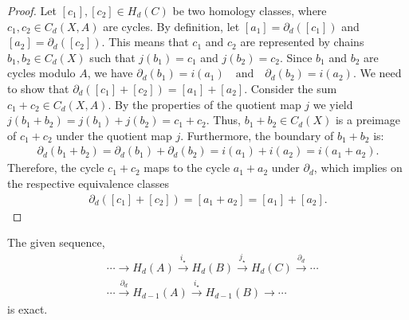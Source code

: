 \begin{proof}
	Let \([c_{1}], [c_{2}] \in H_{d}(C)\) be two homology classes, where \(c_{1}, c_{2} \in C_{d}(X, A)\) are cycles. By definition, let \([a_{1}] = \partial_{d}([c_{1}])\) and \([a_{2}] = \partial_{d}([c_{2}])\). This means that \(c_{1}\) and \(c_{2}\) are represented by chains \(b_{1}, b_{2} \in C_{d}(X)\) such that \(j(b_{1}) = c_{1}\) and \(j(b_{2}) = c_{2}\). Since \(b_{1}\) and \(b_{2}\) are cycles modulo \(A\), we have $\partial_{d}(b_{1}) = i(a_{1}) \quad \text{and} \quad \partial_{d}(b_{2}) = i(a_{2})$. We need to show that $\partial_{d}([c_{1}] + [c_{2}]) = [a_{1}] + [a_{2}]$. Consider the sum \(c_{1} + c_{2} \in C_{d}(X, A)\). By the properties of the quotient map \(j\) we yield $j(b_{1} + b_{2}) = j(b_{1}) + j(b_{2}) = c_{1} + c_{2}$. Thus, \(b_{1} + b_{2} \in C_{d}(X)\) is a preimage of \(c_{1} + c_{2}\) under the quotient map \(j\). Furthermore, the boundary of \(b_{1} + b_{2}\) is:
	\begin{align}
		\partial_{d}(b_{1} + b_{2}) = \partial_{d}(b_{1}) + \partial_{d}(b_{2}) = i(a_{1}) + i(a_{2}) = i(a_{1} + a_{2}). 
	\end{align}
	Therefore, the cycle \(c_{1} + c_{2}\) maps to the cycle \(a_{1} + a_{2}\) under \(\partial_{d}\), which implies on the respective equivalence classes
	\begin{align}
		\partial_{d}([c_{1}] + [c_{2}]) = [a_{1} + a_{2}] = [a_{1}] + [a_{2}]. 
	\end{align}
\end{proof}

\begin{lemma}{\cite[Theorem 2.16]{hatcher2005algebraic}}
	\label{exacthomsequence}
	The given sequence,
	\begin{align}
		  & \cdots \rightarrow H_{d}(A) \xrightarrow{i_\star} H_{d}(B) \xrightarrow{j_\star} H_{d}(C) \xrightarrow{\partial_d} \cdots \\
		  & \cdots \xrightarrow{\partial_d} H_{d-1}(A) \xrightarrow{i_\star} H_{d-1}(B) \rightarrow \cdots                            
	\end{align}
	is exact.
\end{lemma}

